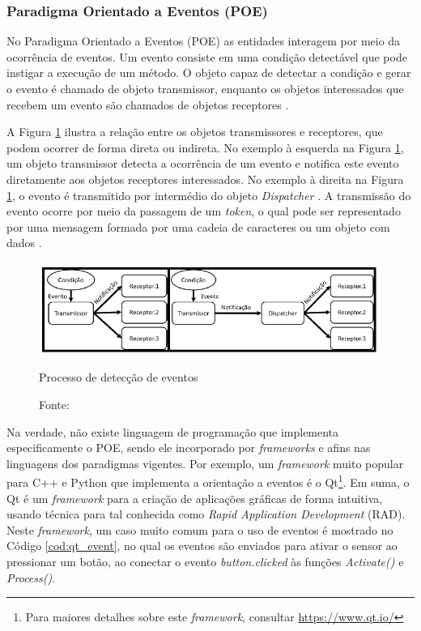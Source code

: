 \subsubsection{Paradigma Orientado a Eventos (POE)}\label{sec:poe}

No Paradigma Orientado a Eventos (POE) as entidades interagem por meio da
ocorrência de eventos. Um evento consiste em uma condição detectável que pode
instigar a execução de um método. O objeto capaz de detectar a condição e gerar
o evento é chamado de objeto transmissor, enquanto os objetos interessados que
recebem um evento são chamados de objetos receptores \cite{ferg_2006}.

A Figura \ref{fig:eventos} ilustra a relação entre os objetos transmissores e
receptores, que podem ocorrer de forma direta ou indireta. No exemplo à esquerda
na Figura \ref{fig:eventos}, um objeto transmissor detecta a ocorrência de um
evento e notifica este evento diretamente aos objetos receptores interessados.
No exemplo à direita na Figura \ref{fig:eventos}, o evento é transmitido por
intermédio do objeto \textit{Dispatcher} \cite{msc_xavier_2014}. A transmissão
do evento ocorre por meio da passagem de um \textit{token}, o qual pode ser
representado por uma mensagem formada por uma cadeia de caracteres ou um objeto
com dados \cite{ferg_2006}.

\begin{figure}[!htb]
  \centering
  \includegraphics[width=\textwidth]{../figures/eventos.png}
  \caption{Processo de detecção de eventos}
  \caption*{Fonte: }
  \label{fig:eventos}
\end{figure}
\FloatBarrier

Na verdade, não existe linguagem de programação que implementa especificamente o
POE, sendo ele incorporado por \textit{frameworks} e afins nas linguagens dos
paradigmas vigentes. Por exemplo, um \textit{framework} muito popular para C++ e
Python que implementa a orientação a eventos é o Qt\footnote{Para maiores
  detalhes sobre este \textit{framework}, consultar \url{https://www.qt.io/}}. Em
suma, o Qt é um \textit{framework} para a criação de aplicações gráficas de
forma intuitiva, usando técnica para tal conhecida como \textit{Rapid
  Application Development} (RAD). Neste \textit{framework}, um caso muito comum
para o uso de eventos é mostrado no Código \ref{cod:qt_event}, no qual os
eventos são enviados para ativar o sensor ao pressionar um botão, ao conectar o
evento \textit{button.clicked} às funções \textit{Activate()} e
\textit{Process()}.

